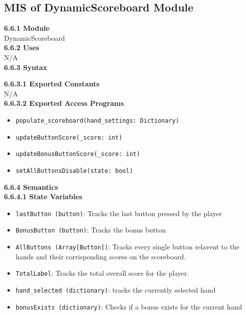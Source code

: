 \documentclass[12pt, titlepage]{article}
\begin{document}
\subsection{MIS of DynamicScoreboard Module}\label{DynamicScoreboard}
\textbf{6.6.1 Module}\\
 DynamicScoreboard\\

\noindent \textbf{6.6.2 Uses}\\

N/A \\

\noindent \textbf{6.6.3 Syntax}

\noindent \textbf{6.6.3.1 Exported Constants}\\

\noindent N/A\\

\textbf{6.6.3.2 Exported Access Programs}
\begin{itemize}
	\item \texttt{populate\_scoreboard(hand\_settings: Dictionary)}
	\item \texttt{updateButtonScore(\_score: int)}
	\item \texttt{updateBonusButtonScore(\_score: int)}
	\item \texttt{setAllButtonsDisable(state: bool)}
	
	
\end{itemize}

\noindent \textbf{6.6.4 Semantics}\\
\textbf{6.6.4.1 State Variables}\\
\begin{itemize}
	\item \texttt{lastButton (button)}: Tracks the last button pressed by the player
	\item \texttt{BonusButton (button)}: Tracks the bonus button 
	\item \texttt{AllButtons (Array[Button])}: Tracks every single button relavent to the hands and their corrisponding scores on the scoreboard.
	\item \texttt{TotalLabel}: Tracks the total overall score for the player.
	\item \texttt{hand\_selected (dictionary)}: tracks the currently selected hand
	\item \texttt{bonusExists (dictionary)}: Checks if a bonus exists for the current hand

\end{itemize}
\end{document}
